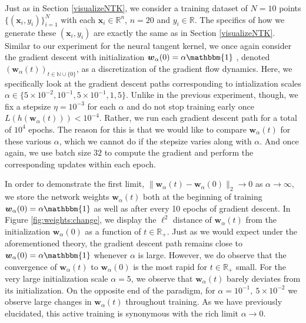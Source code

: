 \documentclass{article}
\begin{document}
Just as in Section \ref{visualizeNTK}, we consider a training dataset of $N = 10$ points $\{(\boldsymbol{x}_i, y_i) \}_{i=1}^N$ with each $\boldsymbol{x}_i \in \mathbb{R}^n$, $n=20$ and $y_i \in \mathbb{R}$. The specifics of how we generate these $(\boldsymbol{x}_i, y_i)$ are exactly the same as in Section \ref{visualizeNTK}. Similar to our experiment for the neural tangent kernel, we once again consider the gradient descent with initialization $\boldsymbol{w}_{\alpha}(0) = \alpha \mathbbm{1}$ , denoted $(\boldsymbol{w}_{\alpha}(t))_{t \in \mathbb{N} \cup \{ 0\}}$, as a discretization of the gradient flow dynamics. Here, we specifically look at the gradient descent paths corresponding to intialization scales $\alpha \in \{ 5\times10^{-2}, 10^{-1}, 5 \times 10^{-1}, 1, 5\}$. Unlike in the previous experiment, though, we fix a stepsize $\eta = 10^{-3}$ for each $\alpha$ and do not stop training early once $L(h(\boldsymbol{w}_{\alpha}(t))) < 10^{-4}$. Rather, we run each gradient descent path for a total of $10^4$ epochs. The reason for this is that we would like to compare $\boldsymbol{w}_{\alpha}(t)$ for these various $\alpha$, which we cannot do if the stepsize varies along with $\alpha$. And once again, we use batch size $32$ to compute the gradient and perform the corresponding updates within each epoch.

In order to demonstrate the first limit, $\| \boldsymbol{w}_{\alpha}(t) - \boldsymbol{w}_{\alpha}(0) \|_2 \rightarrow 0$ as $\alpha \rightarrow \infty$, we store the network weights $\boldsymbol{w}_{\alpha}(t)$ both at the beginning of training $\boldsymbol{w}_{\alpha}(0) = \alpha \mathbbm{1}$ as well as after every 10 epochs of gradient descent. In Figure \ref{fig:weights:change}, we display the $\ell^2$ distance of $\boldsymbol{w}_{\alpha}(t)$ from the initialization $\boldsymbol{w}_{\alpha}(0)$ as a function of $t \in \mathbb{R}_+$. Just as we would expect under the aforementioned theory, the gradient descent path remains close to $\boldsymbol{w}_{\alpha}(0) = \alpha \mathbbm{1}$ whenever $\alpha$ is large. However, we do observe that the convergence of $\boldsymbol{w}_{\alpha}(t)$ to $\boldsymbol{w}_{\alpha}(0)$ is the most rapid for $t \in \mathbb{R}_+$ small. For the very large initialization scale $\alpha = 5$, we observe that $\boldsymbol{w}_{\alpha}(t)$ barely deviates from its initialization. On the opposite end of the paradigm, for $\alpha = 10^{-1}, \ 5 \times 10^{-2}$ we observe large changes in $\boldsymbol{w}_{\alpha}(t)$ throughout training. As we have previously elucidated, this active training is synonymous with the rich limit $\alpha \rightarrow 0$.
\end{document}
